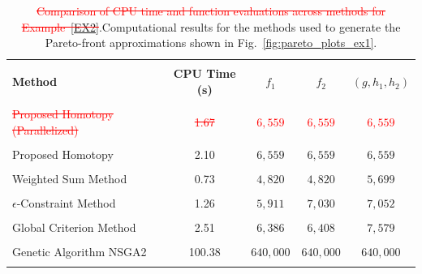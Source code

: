 \documentclass[11pt,pdflatex,sn-mathphys-ay]{sn-jnl}%
\theoremstyle{definition}
\theoremstyle{thmstyleone}%
\theoremstyle{thmstyletwo}%
\theoremstyle{thmstylethree}%
\newcommand{\del}[1]{\textcolor{red}{\sout{#1}}}
\newcommand{\add}[1]{\textcolor{revisionblue}{#1}}
\begin{document}
	
	\begin{table}[h]
		\centering
		\caption{\del{Comparison of CPU time and function evaluations across methods for Example~\ref{EX2}}.\add{Computational results for the methods used to generate the Pareto-front approximations shown in Fig.~\ref{fig:pareto_plots_ex1}.}}
		\begin{tabular}{l c c c c }
			\toprule[1.5pt]
			\\[-1.5ex]
			\textbf{Method} & \textbf{CPU Time (s)} & \textbf{$f_1$} & \textbf{$f_2$} & \textbf{$(g, h_1, h_2)$} \\
			\\[-1.5ex]
			\midrule
			\del{Proposed Homotopy (Parallelized)} & \del{1.67} &  \del{$6{,}559$} & \del{$6{,}559$} & \del{$6{,}559$} \\
			\\[-1.5ex]
			Proposed Homotopy  & 2.10 & $6{,}559$ & $6{,}559$ & $6{,}559$ \\
			\\[-1.5ex]
			Weighted Sum Method  & 0.73 & $4{,}820$ & $4{,}820$ & $5{,}699$ \\
			\\[-1.5ex]
			$\epsilon$-Constraint Method & 1.26 & $5{,}911$ & $7{,}030$ & $7{,}052$ \\
			\\[-1.5ex]
			
			Global Criterion Method & 2.51 & $6{,}386$ & $6{,}408$ & $7{,}579$ \\
			\\[-1.5ex]
			
			Genetic Algorithm NSGA2 & 100.38 & $640{,}000$ & $640{,}000$ & $640{,}000$ \\
			\\[-1.5ex]
			
			\toprule[1.5pt]
		\end{tabular}
		\label{tab:cpu_feval_comparisonEX2}
	\end{table}
	
\end{document}
